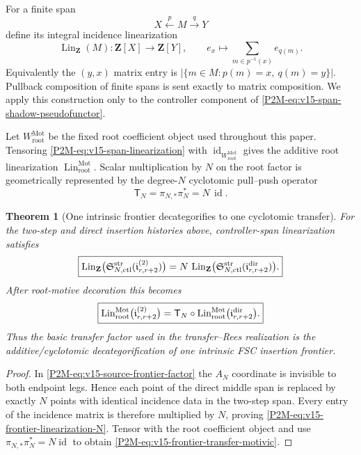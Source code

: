 \documentclass[11pt]{article}
\newtheorem{theorem}{Theorem}[section]
\theoremstyle{remark}
\newcommand{\Z}{\mathbf Z}
\newcommand{\Mot}{\mathrm{Mot}}
\newcommand{\rootc}{\mathrm{root}}
\newcommand{\Lin}{\operatorname{Lin}}
\begin{document}
For a finite span
\[
 X\xleftarrow{p}M\xrightarrow{q}Y
\]
define its integral incidence linearization
\begin{equation}\label{P2M-eq:v15-span-linearization}
 \Lin_{\Z}(M):\Z[X]\longrightarrow\Z[Y],
 \qquad
 e_x\longmapsto
 \sum_{m\in p^{-1}(x)}e_{q(m)}.
\end{equation}
Equivalently the $(y,x)$ matrix entry is
$|\{m\in M:p(m)=x,\ q(m)=y\}|$.  Pullback composition of finite spans is sent
exactly to matrix composition.  We apply this construction only to the
controller component of \eqref{P2M-eq:v15-span-shadow-pseudofunctor}.

Let $W_{\rootc}^{\Mot}$ be the fixed root coefficient object used throughout
this paper.  Tensoring \eqref{P2M-eq:v15-span-linearization} with
$\operatorname{id}_{W_{\rootc}^{\Mot}}$ gives the additive root linearization
$\Lin_{\rootc}^{\Mot}$.  Scalar multiplication by $N$ on the root factor is
geometrically represented by the degree-$N$ cyclotomic pull--push operator
\[
 \mathsf T_N=\pi_{N,*}\pi_N^*=N\,\operatorname{id}.
\]

\begin{theorem}[One intrinsic frontier decategorifies to one cyclotomic transfer]
\label{P2M-thm:v15-frontier-transfer-identity}
For the two-step and direct insertion histories above, controller-span
linearization satisfies
\begin{equation}\label{P2M-eq:v15-frontier-linearization-N}
 \boxed{
 \Lin_{\Z}\bigl(
   \mathfrak S_{N,\rm ctl}^{\rm str}(\mathfrak i_{r,r+2}^{(2)})
 \bigr)
 =N\,
 \Lin_{\Z}\bigl(
   \mathfrak S_{N,\rm ctl}^{\rm str}(\mathfrak i_{r,r+2}^{\rm dir})
 \bigr).}
\end{equation}
After root-motive decoration this becomes
\begin{equation}\label{P2M-eq:v15-frontier-transfer-motivic}
 \boxed{
 \Lin_{\rootc}^{\Mot}\bigl(
   \mathfrak i_{r,r+2}^{(2)}
 \bigr)
 =\mathsf T_N\circ
 \Lin_{\rootc}^{\Mot}\bigl(
   \mathfrak i_{r,r+2}^{\rm dir}
 \bigr).}
\end{equation}
Thus the basic transfer factor used in the transfer--Rees realization is the
additive/cyclotomic decategorification of one intrinsic FSC insertion
frontier.
\end{theorem}

\begin{proof}
In \eqref{P2M-eq:v15-source-frontier-factor} the $A_N$ coordinate is invisible to
both endpoint legs.  Hence each point of the direct middle span is replaced by
exactly $N$ points with identical incidence data in the two-step span.  Every
entry of the incidence matrix is therefore multiplied by $N$, proving
\eqref{P2M-eq:v15-frontier-linearization-N}.  Tensor with the root coefficient
object and use $\pi_{N,*}\pi_N^*=N\operatorname{id}$ to obtain
\eqref{P2M-eq:v15-frontier-transfer-motivic}.
\end{proof}
\end{document}
